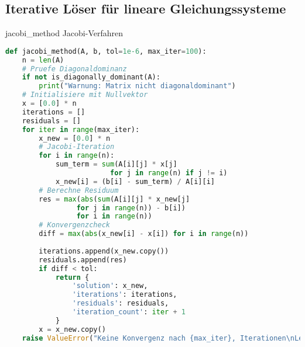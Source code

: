\subsection{Iterative Löser für lineare Gleichungssysteme}

\begin{examplecode}{jacobi\_method} Jacobi-Verfahren
\begin{lstlisting}[language=Python, style=basesmol]
def jacobi_method(A, b, tol=1e-6, max_iter=100):
    n = len(A)
    # Pruefe Diagonaldominanz
    if not is_diagonally_dominant(A):
        print("Warnung: Matrix nicht diagonaldominant")
    # Initialisiere mit Nullvektor
    x = [0.0] * n
    iterations = []
    residuals = []
    for iter in range(max_iter):
        x_new = [0.0] * n
        # Jacobi-Iteration
        for i in range(n):
            sum_term = sum(A[i][j] * x[j] 
                         for j in range(n) if j != i)
            x_new[i] = (b[i] - sum_term) / A[i][i]
        # Berechne Residuum
        res = max(abs(sum(A[i][j] * x_new[j] 
                 for j in range(n)) - b[i]) 
                 for i in range(n))
        # Konvergenzcheck
        diff = max(abs(x_new[i] - x[i]) for i in range(n))
        
        iterations.append(x_new.copy())
        residuals.append(res)
        if diff < tol:
            return {
                'solution': x_new,
                'iterations': iterations,
                'residuals': residuals,
                'iteration_count': iter + 1
            }
        x = x_new.copy()
    raise ValueError("Keine Konvergenz nach {max_iter}, Iterationen\nLetztes Residuum: {res}")
\end{lstlisting}
\end{examplecode}


